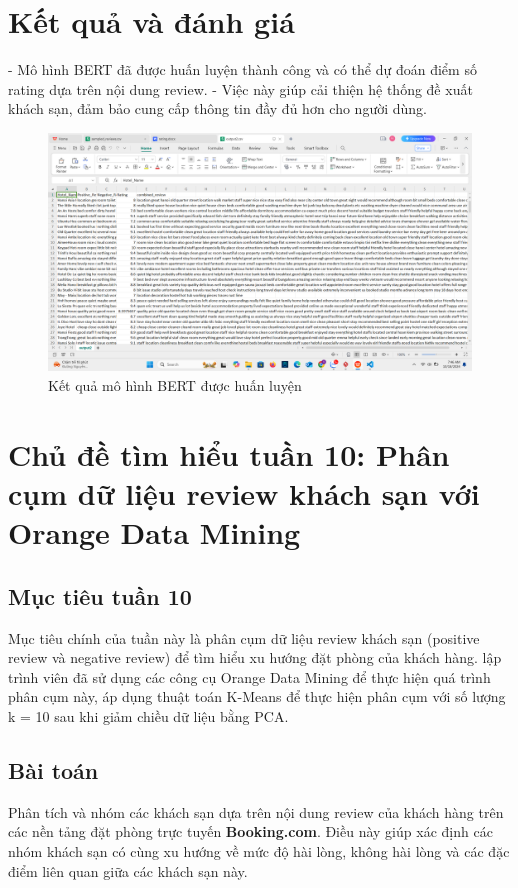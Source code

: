 \section{Kết quả và đánh giá}
- Mô hình BERT đã được huấn luyện thành công và có thể dự đoán điểm số rating dựa trên nội dung review.  
- Việc này giúp cải thiện hệ thống đề xuất khách sạn, đảm bảo cung cấp thông tin đầy đủ hơn cho người dùng.
\begin{figure}[H]
        \centering
        \includegraphics[width=1\linewidth]{Figures/9.5.png}
        \caption{Kết quả mô hình BERT được huấn luyện}
        \label{fig:enter-label}
    \end{figure}

\section{Chủ đề tìm hiểu tuần 10: Phân cụm dữ liệu review khách sạn với Orange Data Mining}

\subsection{Mục tiêu tuần 10}
Mục tiêu chính của tuần này là phân cụm dữ liệu review khách sạn (positive review và negative review) để tìm hiểu xu hướng đặt phòng của khách hàng. lập trình viên đã sử dụng các công cụ Orange Data Mining để thực hiện quá trình phân cụm này, áp dụng thuật toán K-Means để thực hiện phân cụm với số lượng k = 10 sau khi giảm chiều dữ liệu bằng PCA.

\subsection{Bài toán}
Phân tích và nhóm các khách sạn dựa trên nội dung review của khách hàng trên các nền tảng đặt phòng trực tuyến \textbf{Booking.com}. Điều này giúp xác định các nhóm khách sạn có cùng xu hướng về mức độ hài lòng, không hài lòng và các đặc điểm liên quan giữa các khách sạn này.

